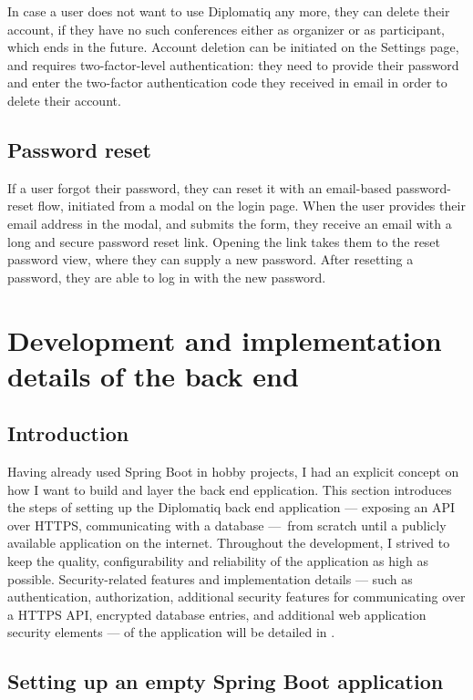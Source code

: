 In case a user does not want to use Diplomatiq any more, they can delete their account, if they have no such conferences either as organizer or as participant, which ends in the future. Account deletion can be initiated on the Settings page, and requires two-factor-level authentication: they need to provide their password and enter the two-factor authentication code they received in email in order to delete their account.

\subsection{Password reset}

If a user forgot their password, they can reset it with an email-based password-reset flow, initiated from a modal on the login page. When the user provides their email address in the modal, and submits the form, they receive an email with a long and secure password reset link. Opening the link takes them to the reset password view, where they can supply a new password. After resetting a password, they are able to log in with the new password.

\section{Development and implementation details of the back end}

\subsection{Introduction}

Having already used Spring Boot in hobby projects, I had an explicit concept on how I want to build and layer the back end epplication. This section introduces the steps of setting up the Diplomatiq back end application — exposing an API over HTTPS, communicating with a database — from scratch until a publicly available application on the internet. Throughout the development, I strived to keep the quality, configurability and reliability of the application as high as possible. Security-related features and implementation details — such as authentication, authorization, additional security features for communicating over a HTTPS API, encrypted database entries, and additional web application security elements — of the application will be detailed in .

\subsection{Setting up an empty Spring Boot application}

